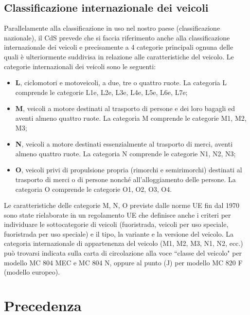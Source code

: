 	      \subsection{Classificazione internazionale dei veicoli}
	      
	      Parallelamente alla classificazione in uso nel nostro paese (classificazione nazionale), il CdS prevede che si faccia riferimento anche alla classificazione internazionale dei veicoli\cite{UE2007} e precisamente a 4 categorie principali ognuna delle quali è ulteriormente suddivisa in relazione alle caratteristiche del veicolo.
	      Le categorie internazionali dei veicoli sono le seguenti:
	      \begin{itemize}
	      	\item \textbf{L}, ciclomotori e motoveicoli, a due, tre o quattro ruote. La categoria L comprende le categorie L1e, L2e, L3e, L4e, L5e, L6e, L7e;
	      	\item \textbf{M}, veicoli a motore destinati al trasporto di persone e dei loro bagagli ed aventi almeno quattro ruote. La categoria M comprende le categorie M1, M2, M3;
	      	\item \textbf{N}, veicoli a motore destinati essenzialmente al trasporto di merci, aventi almeno quattro ruote. La categoria N comprende le categorie N1, N2, N3;
	      	\item \textbf{O}, veicoli privi di propulsione propria (rimorchi e semirimorchi) destinati al trasporto di merci o di persone nonché all'alloggiamento delle persone. La categoria O comprende le categorie O1, O2, O3, O4.
	      \end{itemize}
	      
	      Le caratteristiche delle categorie M, N, O previste dalle norme UE fin dal 1970 sono state rielaborate in un regolamento UE che definisce anche i criteri per individuare le sottocategorie di veicoli (fuoristrada, veicoli per uso speciale, fuoristrada per uso speciale) e il tipo, la variante e la versione del veicolo.
	      La categoria internazionale di appartenenza del veicolo (M1, M2, M3, N1, N2, ecc.) può trovarsi indicata sulla carta di circolazione alla voce ``classe del veicolo" per modello MC 804 MEC e MC 804 N, oppure al punto (J) per modello MC 820 F (modello europeo). 
	      
\section{Precedenza}

